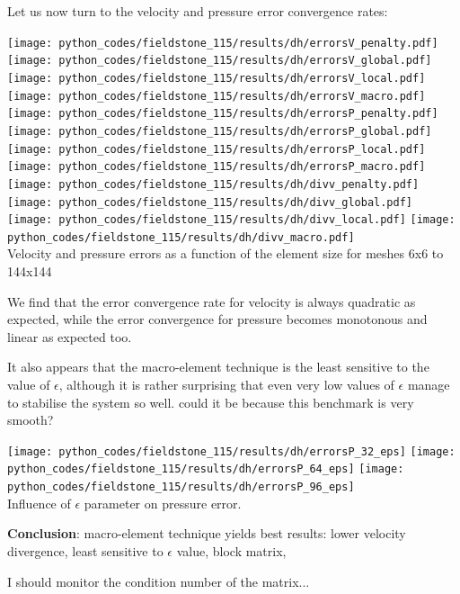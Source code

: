 Let us now turn to the velocity and pressure error convergence rates: 
\begin{center}
\texttt{[image: python\_codes/fieldstone\_115/results/dh/errorsV\_penalty.pdf]}
\texttt{[image: python\_codes/fieldstone\_115/results/dh/errorsV\_global.pdf]}
\texttt{[image: python\_codes/fieldstone\_115/results/dh/errorsV\_local.pdf]}
\texttt{[image: python\_codes/fieldstone\_115/results/dh/errorsV\_macro.pdf]}\\
\texttt{[image: python\_codes/fieldstone\_115/results/dh/errorsP\_penalty.pdf]}
\texttt{[image: python\_codes/fieldstone\_115/results/dh/errorsP\_global.pdf]}
\texttt{[image: python\_codes/fieldstone\_115/results/dh/errorsP\_local.pdf]}
\texttt{[image: python\_codes/fieldstone\_115/results/dh/errorsP\_macro.pdf]}\\
\texttt{[image: python\_codes/fieldstone\_115/results/dh/divv\_penalty.pdf]}
\texttt{[image: python\_codes/fieldstone\_115/results/dh/divv\_global.pdf]}
\texttt{[image: python\_codes/fieldstone\_115/results/dh/divv\_local.pdf]}
\texttt{[image: python\_codes/fieldstone\_115/results/dh/divv\_macro.pdf]}\\
{\captionfont Velocity and pressure errors as a function of the element size for meshes 6x6 to 144x144}
\end{center}
We find that the error convergence rate for velocity is always quadratic as expected, 
while the error convergence for pressure becomes monotonous and linear as expected too.

It also appears that the macro-element technique is the least sensitive to the value of $\epsilon$, 
although it is rather surprising that even very low values of $\epsilon$ manage to stabilise the 
system so well. could it be because this benchmark is very smooth? 
\begin{center}
\texttt{[image: python\_codes/fieldstone\_115/results/dh/errorsP\_32\_eps]}
\texttt{[image: python\_codes/fieldstone\_115/results/dh/errorsP\_64\_eps]}
\texttt{[image: python\_codes/fieldstone\_115/results/dh/errorsP\_96\_eps]}\\
{\captionfont Influence of $\epsilon$ parameter on pressure error.}
\end{center}

{\bf Conclusion}: macro-element technique yields best results: lower velocity divergence, 
least sensitive to $\epsilon$ value, block matrix,

I should monitor the condition number of the matrix...

\newpage
